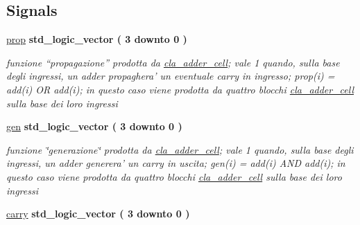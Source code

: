 \subsection*{Signals}
 \begin{DoxyCompactItemize}
\item 
\hyperlink{group___nibble_adder_ga3abd8d433ff039baabc0c6fc2126578b}{prop} {\bfseries \textcolor{vhdlchar}{std\+\_\+logic\+\_\+vector}\textcolor{vhdlchar}{ }\textcolor{vhdlchar}{(}\textcolor{vhdlchar}{ }\textcolor{vhdlchar}{ } \textcolor{vhdldigit}{3} \textcolor{vhdlchar}{ }\textcolor{vhdlchar}{downto}\textcolor{vhdlchar}{ }\textcolor{vhdlchar}{ } \textcolor{vhdldigit}{0} \textcolor{vhdlchar}{ }\textcolor{vhdlchar}{)}\textcolor{vhdlchar}{ }} 
\begin{DoxyCompactList}\small\item\em funzione “propagazione” prodotta da \hyperlink{classcla__adder__cell}{cla\+\_\+adder\+\_\+cell}; vale 1 quando, sulla base degli ingressi, un adder propaghera' un eventuale carry in ingresso; prop(i) = add(i) O\+R add(i); in questo caso viene prodotta da quattro blocchi \hyperlink{classcla__adder__cell}{cla\+\_\+adder\+\_\+cell} sulla base dei loro ingressi \end{DoxyCompactList}\item 
\hyperlink{group___nibble_adder_gac6c069fe4ec1c0a42272d3de4be6f45f}{gen} {\bfseries \textcolor{vhdlchar}{std\+\_\+logic\+\_\+vector}\textcolor{vhdlchar}{ }\textcolor{vhdlchar}{(}\textcolor{vhdlchar}{ }\textcolor{vhdlchar}{ } \textcolor{vhdldigit}{3} \textcolor{vhdlchar}{ }\textcolor{vhdlchar}{downto}\textcolor{vhdlchar}{ }\textcolor{vhdlchar}{ } \textcolor{vhdldigit}{0} \textcolor{vhdlchar}{ }\textcolor{vhdlchar}{)}\textcolor{vhdlchar}{ }} 
\begin{DoxyCompactList}\small\item\em funzione \char`\"{}generazione\char`\"{} prodotta da \hyperlink{classcla__adder__cell}{cla\+\_\+adder\+\_\+cell}; vale 1 quando, sulla base degli ingressi, un adder generera' un carry in uscita; gen(i) = add(i) A\+N\+D add(i); in questo caso viene prodotta da quattro blocchi \hyperlink{classcla__adder__cell}{cla\+\_\+adder\+\_\+cell} sulla base dei loro ingressi \end{DoxyCompactList}\item 
\hyperlink{group___nibble_adder_ga8f5524d80e551d479327a16bb32abcaa}{carry} {\bfseries \textcolor{vhdlchar}{std\+\_\+logic\+\_\+vector}\textcolor{vhdlchar}{ }\textcolor{vhdlchar}{(}\textcolor{vhdlchar}{ }\textcolor{vhdlchar}{ } \textcolor{vhdldigit}{3} \textcolor{vhdlchar}{ }\textcolor{vhdlchar}{downto}\textcolor{vhdlchar}{ }\textcolor{vhdlchar}{ } \textcolor{vhdldigit}{0} \textcolor{vhdlchar}{ }\textcolor{vhdlchar}{)}\textcolor{vhdlchar}{ }} 

\end{DoxyCompactItemize}
